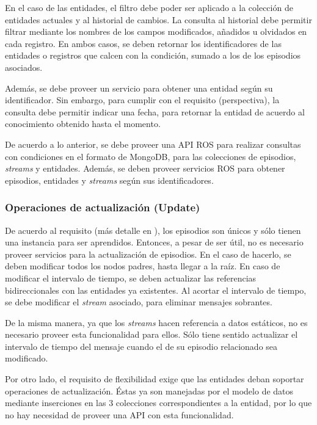 En el caso de las entidades, el filtro debe poder ser aplicado a la colección de entidades actuales y al historial de cambios. La consulta al historial debe permitir filtrar mediante los nombres de los campos modificados, añadidos u olvidados en cada registro. En ambos casos, se deben retornar los identificadores de las entidades o registros que calcen con la condición, sumado a los de los episodios asociados.

Además, se debe proveer un servicio para obtener una entidad según su identificador. Sin embargo, para cumplir con el requisito  (perspectiva), la consulta debe permitir indicar una fecha, para retornar la entidad de acuerdo al conocimiento obtenido hasta el momento.

De acuerdo a lo anterior, se debe proveer una API ROS para realizar consultas con condiciones en el formato de MongoDB, para las colecciones de episodios, \textit{streams} y entidades. Además, se deben proveer servicios ROS para obtener episodios, entidades y \textit{streams} según sus identificadores.

\subsubsection{Operaciones de actualización (Update)}

De acuerdo al requisito  (más detalle en ), los episodios son únicos y sólo tienen una instancia para ser aprendidos. Entonces, a pesar de ser útil, no es necesario proveer servicios para la actualización de episodios. En el caso de hacerlo, se deben modificar todos los nodos padres, hasta llegar a la raíz. En caso de modificar el intervalo de tiempo, se deben actualizar las referencias bidireccionales con las entidades ya existentes. Al acortar el intervalo de tiempo, se debe modificar el \textit{stream} asociado, para eliminar mensajes sobrantes.

 De la misma manera, ya que los \textit{streams} hacen referencia a datos estáticos, no es necesario proveer esta funcionalidad para ellos. Sólo tiene sentido actualizar el intervalo de tiempo del mensaje cuando el de su episodio relacionado sea modificado.

Por otro lado, el requisito de flexibilidad  exige que las entidades deban soportar operaciones de actualización. Éstas ya son manejadas por el modelo de datos mediante inserciones en las 3 colecciones correspondientes a la entidad, por lo que no hay necesidad de proveer una API con esta funcionalidad.

